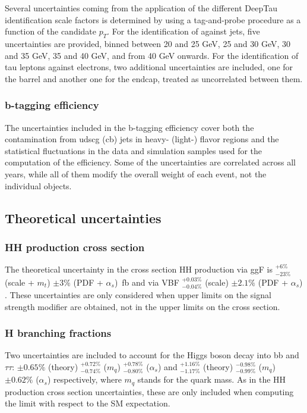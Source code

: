\documentclass[../main.tex]{subfiles}
\begin{document}
Several uncertainties coming from the application of the different DeepTau identification scale factors is determined by using a tag-and-probe procedure as a function of the \tauh{} candidate $p_T$. For the identification of \tauh{} against jets, five uncertainties are provided, binned between 20 and 25 GeV, 25 and 30 GeV, 30 and 35 GeV, 35 and 40 GeV, and from 40 GeV onwards. For the identification of tau leptons against electrons, two additional uncertainties are included, one for the barrel and another one for the endcap, treated as uncorrelated between them.

\subsubsection*{b-tagging efficiency}

The uncertainties included in the b-tagging efficiency cover both the contamination from udscg (cb) jets in heavy- (light-) flavor regions and the statistical fluctuations in the data and simulation samples used for the computation of the efficiency. Some of the uncertainties are correlated across all years, while all of them modify the overall weight of each event, not the individual objects.


\subsection*{Theoretical uncertainties}

\subsubsection*{HH production cross section}

The theoretical uncertainty in the cross section HH production via ggF is ${}^{+6\%}_{-23\%}$ (scale + $m_t$) $\pm 3\%$ (PDF + $\alpha_s$)~fb \cite{hh:results:ggf_xs} and via VBF ${}^{+0.03\%}_{-0.04\%}$ (scale) $\pm 2.1\%$ (PDF + $\alpha_s$) \cite{hh:results:vbf_xs}. These uncertainties are only considered when upper limits on the signal strength modifier are obtained, not in the upper limits on the cross section.

\subsubsection*{H branching fractions}

Two uncertainties are included to account for the Higgs boson decay \cite{hh:results:h_bf} into bb and $\tau\tau$: $\pm 0.65\%$ (theory) ${}^{+0.72\%}_{-0.74\%}$ ($m_q$) ${}^{+0.78\%}_{-0.80\%}$ ($\alpha_s$) and 
${}^{+1.16\%}_{-1.17\%}$  (theory) ${}^{-0.98\%}_{-0.99\%}$ ($m_q$) $\pm 0.62\%$ ($\alpha_s$) respectively, where $m_q$ stands for the quark mass. As in the HH production cross section uncertainties, these are only included when computing the limit with respect to the SM expectation.
\end{document}
